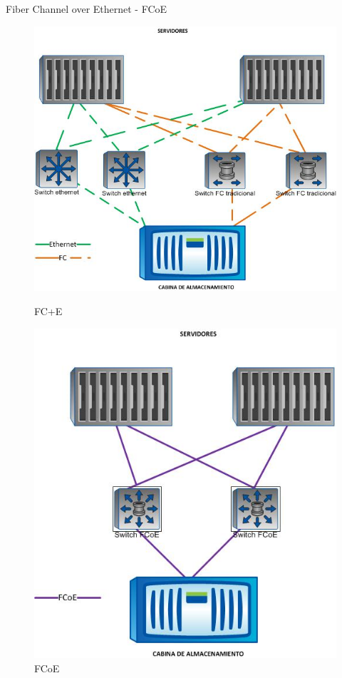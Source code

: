 \documentclass[10pt]{beamer}
\begin{document}
\begin{frame}{Fiber Channel over Ethernet -  FCoE}
\begin{figure}
\centering
\begin{minipage}{.5\textwidth}
  \centering
  \includegraphics[width=.8\linewidth]{fcoe1.jpg}
  \caption{FC+E}
\end{minipage}%
\begin{minipage}{.5\textwidth}
  \centering
  \includegraphics[width=.8\linewidth]{fcoe2.jpg}
  \caption{FCoE}
\end{minipage}
\end{figure}
\end{frame}
\end{document}
